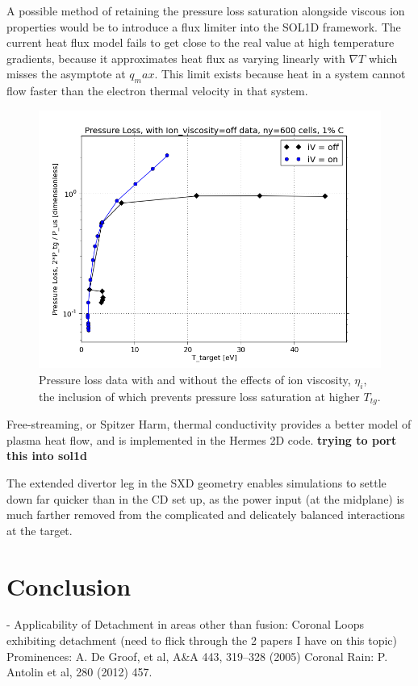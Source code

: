\documentclass[11pt]{article}  %
\providecommand{\Ttg}{$T_{tg}$} %
\begin{document}
A possible method of retaining the pressure loss saturation alongside viscous ion properties would be to introduce a flux limiter into the SOL1D framework. The current heat flux model \cite{Braginskii1965} fails to get close to the real value at high temperature gradients, because it approximates heat flux as varying linearly with $\nabla T$ which misses the asymptote at $q_max$. This limit exists because heat in a system cannot flow faster than the electron thermal velocity in that system.

\begin{figure}
\includegraphics[scale=0.5]{Figures/sol1d/PL_iVpts.png}
\centering
\caption{Pressure loss data with and without the effects of ion viscosity, $\eta_i$, the inclusion of which prevents pressure loss saturation at higher \Ttg.}\label{figPL_iVpts}
\end{figure}

Free-streaming, or Spitzer Harm, thermal conductivity provides a better model of plasma heat flow, and is implemented in the Hermes 2D code. \textbf{trying to port this into sol1d}

The extended divertor leg in the SXD geometry enables simulations to settle down far quicker than in the CD set up, as the power input (at the midplane) is much farther removed from the complicated and delicately balanced interactions at the target. 




\section{Conclusion}\label{secConclusion}

- Applicability of Detachment in areas other than fusion: Coronal Loops exhibiting detachment (need to flick through the 2 papers I have on this topic) 
Prominences: A. De Groof, et al, A\&A 443, 319–328 (2005)
Coronal Rain: P. Antolin et al, 280 (2012) 457.





\printbibliography
\end{document}
